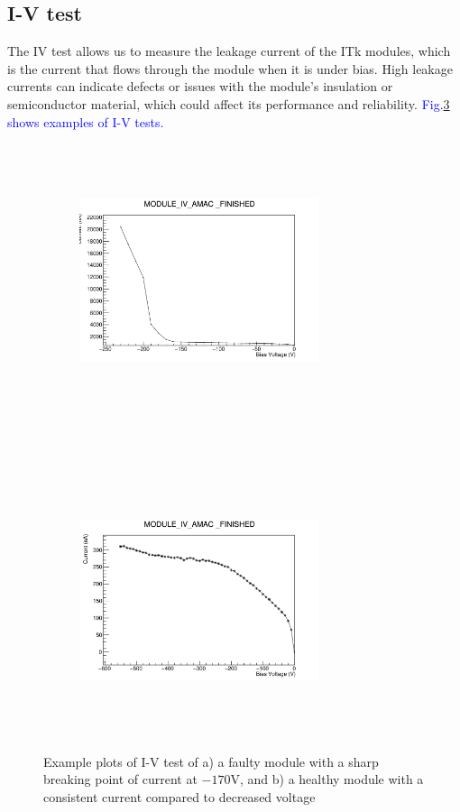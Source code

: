 \subsection{I-V test}
The IV test allows us to measure the leakage current of the ITk modules, which is the current that flows through the module when it is under bias. High leakage currents can indicate defects or issues with the module's insulation or semiconductor material, which could affect its performance and reliability. \textcolor{blue}{Fig.\ref{fig:IV} shows examples of I-V tests.}

\begin{figure}[h]
    
    \begin{subfigure}[b]{0.45\textwidth}
        \centering
        \includegraphics[width=7cm,height=8cm,keepaspectratio]{Figures/test/IV1.png}
        \caption{}\label{fig:IV1}
    \end{subfigure}
    ~
    \begin{subfigure}[b]{0.45\textwidth}
        \centering
        \includegraphics[width=7cm,height=8cm,keepaspectratio]{Figures/test/IV2.png}
        \caption{}\label{fig:IV2}
    \end{subfigure}
    \caption{Example plots of I-V test of a) a faulty module with a sharp breaking point of current at $-170 \si{\volt}$, and b) a healthy module with a consistent current compared to decreased voltage}
    \label{fig:IV}
\end{figure}

